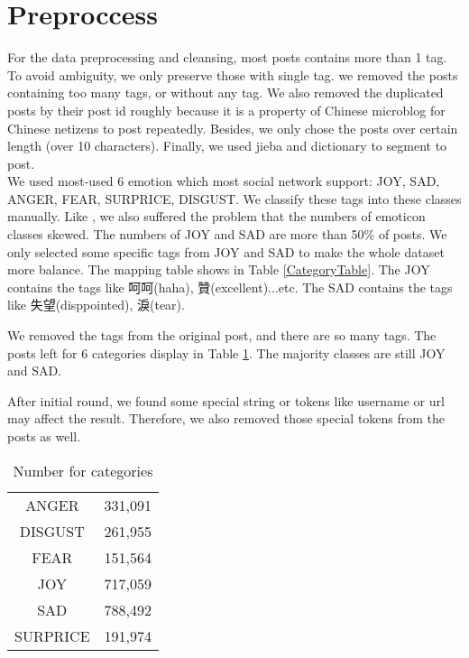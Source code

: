\section{Preproccess}

For the data preprocessing and cleansing, most posts contains more than 1 tag. To avoid ambiguity, we only preserve those with single tag.
we removed the posts containing too many tags, or without any tag. We also removed the duplicated posts by their post id roughly because it is a property of Chinese microblog \cite{fu2013reality} for Chinese netizens to post repeatedly. 
Besides, we only chose the posts over certain length (over 10 characters). Finally, we used jieba and dictionary to segment to post. \\

We used most-used 6 emotion which most social network support: JOY, SAD, ANGER, FEAR, SURPRICE, DISGUST.
We classify these tags into these classes manually. 
Like \cite{zhao2012moodlens}, we also suffered the problem that the numbers of emoticon classes skewed. The numbers of JOY and SAD are more than 50\% of posts. 
We only selected some specific tags from JOY and SAD to make the whole dataset more balance.   
The mapping table shows in Table \ref{CategoryTable}. The JOY contains the tags like 呵呵(haha), 贊(excellent)...etc. 
The SAD contains the tags like 失望(disppointed), 淚(tear).


We removed the tags from the original post, and there are so many tags. 
The posts left for 6 categories display in Table \ref{cat_num}. The majority classes are still JOY and SAD. 

After initial round, we found some special string or tokens like username or url may affect the result. 
Therefore, we also removed those special tokens from the posts as well.

\begin{table}[]
\centering
\caption{Number for categories}
\label{cat_num}
\begin{tabular}{|c|c|}
\hline
ANGER      &331,091 \\                                                           
DISGUST    &261,955 \\                                                         
FEAR       &151,564 \\                                                         
JOY        &717,059 \\                                                           
SAD        &788,492 \\                                                           
SURPRICE   &191,974 \\
\hline
\end{tabular}
\end{table}


